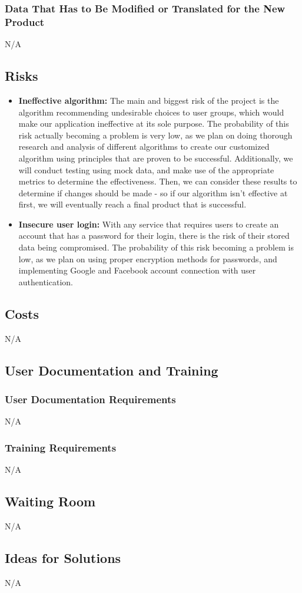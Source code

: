 \documentclass[12pt]{article}
\begin{document}
\subsubsection{Data That Has to Be Modified or Translated for the New Product}
N/A

\subsection{Risks}

\begin{itemize}
	\item \textbf{Ineffective algorithm:} The main and biggest risk of the project is the algorithm recommending undesirable choices to user groups, which would make our application ineffective at its sole purpose. The probability of this risk actually becoming a problem is very low, as we plan on doing thorough research and analysis of different algorithms to create our customized algorithm using principles that are proven to be successful. Additionally, we will conduct testing using mock data, and make use of the appropriate metrics to determine the effectiveness. Then, we can consider these results to determine if changes should be made - so if our algorithm isn't effective at first, we will eventually reach a final product that is successful.
	\item \textbf{Insecure user login:} With any service that requires users to create an account that has a password for their login, there is the risk of their stored data being compromised. The probability of this risk becoming a problem is low, as we plan on using proper encryption methods for passwords, and implementing Google and Facebook account connection with user authentication.
\end{itemize}


\subsection{Costs}
N/A

\subsection{User Documentation and Training}

\subsubsection{User Documentation Requirements}
N/A

\subsubsection{Training Requirements}
N/A

\subsection{Waiting Room}
N/A

\subsection{Ideas for Solutions}
N/A
\end{document}
